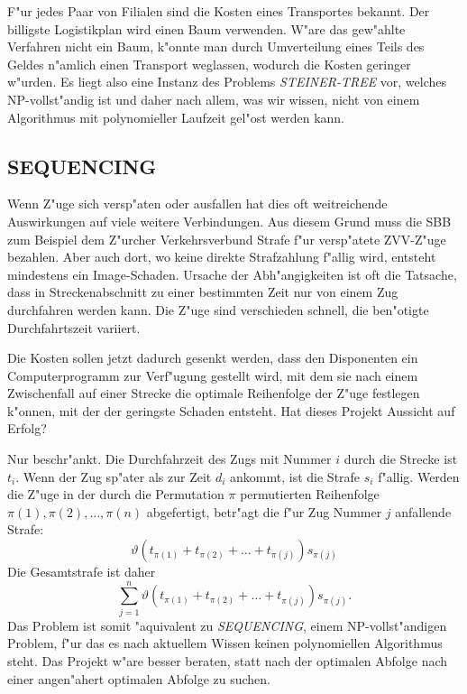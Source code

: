 \medskip

F"ur jedes Paar von Filialen sind die Kosten eines Transportes
bekannt. Der billigste Logistikplan wird einen Baum verwenden.
W"are das gew"ahlte Verfahren nicht ein Baum, k"onnte man
durch Umverteilung eines Teils des Geldes n"amlich einen
Transport weglassen, wodurch die Kosten geringer w"urden.
Es liegt also eine Instanz des Problems {\it STEINER-TREE}
vor, welches NP-vollst"andig ist und daher nach allem, was
wir wissen, nicht von einem Algorithmus mit polynomieller
Laufzeit gel"ost werden kann.

\subsection{SEQUENCING}
Wenn Z"uge sich versp"aten oder ausfallen hat dies oft weitreichende
Auswirkungen auf viele weitere Verbindungen.
Aus diesem Grund muss die SBB zum Beispiel dem Z"urcher Verkehrsverbund
Strafe f"ur versp"atete ZVV-Z"uge bezahlen. Aber auch dort, wo
keine direkte Strafzahlung f"allig wird, entsteht mindestens ein
Image-Schaden. Ursache der Abh"angigkeiten ist oft die Tatsache,
dass in Streckenabschnitt zu einer bestimmten Zeit nur von einem
Zug durchfahren werden kann. Die Z"uge sind verschieden schnell,
die ben"otigte Durchfahrtszeit variiert. 

Die Kosten sollen jetzt dadurch gesenkt werden, dass den Disponenten
ein Computerprogramm zur Verf"ugung gestellt wird, mit dem sie nach
einem Zwischenfall auf einer Strecke die optimale Reihenfolge der Z"uge
festlegen k"onnen, mit der der geringste Schaden entsteht.
Hat dieses Projekt Aussicht auf Erfolg?

\medskip

Nur beschr"ankt.
Die Durchfahrzeit des Zugs mit Nummer $i$ durch die Strecke ist $t_i$.
Wenn der Zug sp"ater als zur Zeit $d_i$ ankommt, ist die Strafe $s_i$
f"allig.
Werden die Z"uge in der durch die Permutation $\pi$
permutierten Reihenfolge  $\pi(1),\pi(2),\dots,\pi(n)$ abgefertigt,
betr"agt die f"ur Zug Nummer $j$ anfallende Strafe:
\[
\vartheta(t_{\pi(1)}+t_{\pi(2)}+\dots+t_{\pi(j)})s_{\pi(j)}
\]
Die Gesamtstrafe ist daher
\[
\sum_{j=1}^n \vartheta(t_{\pi(1)}+t_{\pi(2)}+\dots+t_{\pi(j)})s_{\pi(j)}.
\]
Das Problem ist somit "aquivalent zu {\it SEQUENCING}, einem
NP-vollst"andigen Problem, f"ur das es nach aktuellem Wissen keinen
polynomiellen Algorithmus steht. Das Projekt w"are besser beraten,
statt nach der optimalen Abfolge nach einer angen"ahert optimalen Abfolge
zu suchen.

